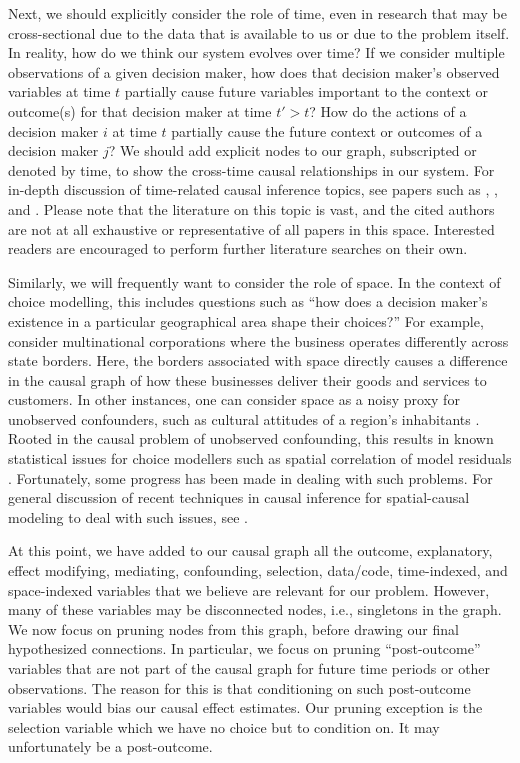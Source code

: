 Next, we should explicitly consider the role of time, even in research that may be cross-sectional due to the data that is available to us or due to the problem itself.
In reality, how do we think our system evolves over time?
If we consider multiple observations of a given decision maker, how does that decision maker's observed variables at time $t$ partially cause future variables important to the context or outcome(s) for that decision maker at time $t' > t$?
How do the actions of a decision maker $i$ at time $t$ partially cause the future context or outcomes of a decision maker $j$?
We should add explicit nodes to our graph, subscripted or denoted by time, to show the cross-time causal relationships in our system.
For in-depth discussion of time-related causal inference topics, see papers such as \citet{gill_2001_causal}, \citet{eichler_2007_granger}, and \citet{peters_2013_causal}.
Please note that the literature on this topic is vast, and the cited authors are not at all exhaustive or representative of all papers in this space.
Interested readers are encouraged to perform further literature searches on their own.

Similarly, we will frequently want to consider the role of space.
In the context of choice modelling, this includes questions such as ``how does a decision maker's existence in a particular geographical area shape their choices?''
For example, consider multinational corporations where the business operates differently across state borders.
Here, the borders associated with space directly causes a difference in the causal graph of how these businesses deliver their goods and services to customers.
In other instances, one can consider space as a noisy proxy for unobserved confounders, such as cultural attitudes of a region's inhabitants \citep{paciorek_2010_importance}.
Rooted in the causal problem of unobserved confounding, this results in known statistical issues for choice modellers such as spatial correlation of model residuals \citep{fleming_2004_techniques}.
Fortunately, some progress has been made in dealing with such problems.
For general discussion of recent techniques in causal inference for spatial-causal modeling to deal with such issues, see \citet{osama_2019_inferring}.

At this point, we have added to our causal graph all the
outcome, explanatory, effect modifying, mediating, confounding, selection, data/code, time-indexed, and space-indexed variables that we believe are relevant for our problem.
However, many of these variables may be disconnected nodes, i.e., singletons in the graph.
We now focus on pruning nodes from this graph, before drawing our final hypothesized connections.
In particular, we focus on pruning ``post-outcome'' variables that are not part of the causal graph for future time periods or other observations.
The reason for this is that conditioning on such post-outcome variables would bias our causal effect estimates.
Our pruning exception is the selection variable which we have no choice but to condition on.
It may unfortunately be a post-outcome.


